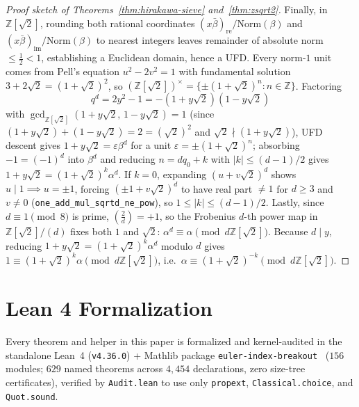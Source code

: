 \documentclass[11pt]{amsart}
\theoremstyle{definition}
\theoremstyle{remark}
\begin{document}
\begin{proof}[Proof sketch of Theorems~\ref{thm:hirakawa-sieve} and~\ref{thm:zsqrt2}]
Finally, in $\mathbb{Z}[\sqrt{2}]$, rounding both rational coordinates $(x \bar{\beta})_{\mathrm{re}} / \mathrm{Norm}(\beta)$ and $(x \bar{\beta})_{\mathrm{im}} / \mathrm{Norm}(\beta)$ to nearest integers leaves remainder of absolute norm $\le \frac{1}{2} < 1$, establishing a Euclidean domain, hence a UFD. Every norm-$1$ unit comes from Pell's equation $u^2 - 2 v^2 = 1$ with fundamental solution $3 + 2\sqrt{2} = (1 + \sqrt{2})^2$, so $(\mathbb{Z}[\sqrt{2}])^\times = \{\pm(1 + \sqrt{2})^n : n \in \mathbb{Z}\}$. Factoring
\[
  q^d = 2 y^2 - 1 = -(1 + y\sqrt{2})(1 - y\sqrt{2})
\]
with $\gcd_{\mathbb{Z}[\sqrt{2}]}(1 + y\sqrt{2},\, 1 - y\sqrt{2}) = 1$ (since $(1 + y\sqrt{2}) + (1 - y\sqrt{2}) = 2 = (\sqrt{2})^2$ and $\sqrt{2} \nmid (1 + y\sqrt{2})$), UFD descent gives $1 + y\sqrt{2} = \varepsilon \beta^d$ for a unit $\varepsilon = \pm(1 + \sqrt{2})^n$; absorbing $-1 = (-1)^d$ into $\beta^d$ and reducing $n = d q_0 + k$ with $|k| \le (d - 1)/2$ gives $1 + y\sqrt{2} = (1 + \sqrt{2})^k \alpha^d$. If $k = 0$, expanding $(u + v\sqrt{2})^d$ shows $u \mid 1 \implies u = \pm 1$, forcing $(\pm 1 + v\sqrt{2})^d$ to have real part $\ne 1$ for $d \ge 3$ and $v \ne 0$ (\texttt{one\_add\_mul\_sqrtd\_ne\_pow}), so $1 \le |k| \le (d - 1)/2$. Lastly, since $d \equiv 1 \pmod 8$ is prime, $\left(\frac{2}{d}\right) = +1$, so the Frobenius $d$-th power map in $\mathbb{Z}[\sqrt{2}]/(d)$ fixes both $1$ and $\sqrt{2}$: $\alpha^d \equiv \alpha \pmod{d\mathbb{Z}[\sqrt{2}]}$. Because $d \mid y$, reducing $1 + y\sqrt{2} = (1 + \sqrt{2})^k \alpha^d$ modulo $d$ gives $1 \equiv (1 + \sqrt{2})^k \alpha \pmod{d\mathbb{Z}[\sqrt{2}]}$, i.e.\ $\alpha \equiv (1 + \sqrt{2})^{-k} \pmod{d\mathbb{Z}[\sqrt{2}]}$.
\end{proof}

\section{Lean 4 Formalization}

Every theorem and helper in this paper is formalized and kernel-audited in the standalone Lean~4 (\texttt{v4.36.0}) + Mathlib package \texttt{euler-index-breakout}~\cite{HamiltonEuler} ($156$ modules; $629$ named theorems across $4{,}454$ declarations, zero size-tree certificates), verified by \texttt{Audit.lean} to use only \texttt{propext}, \texttt{Classical.choice}, and \texttt{Quot.sound}.
\end{document}

